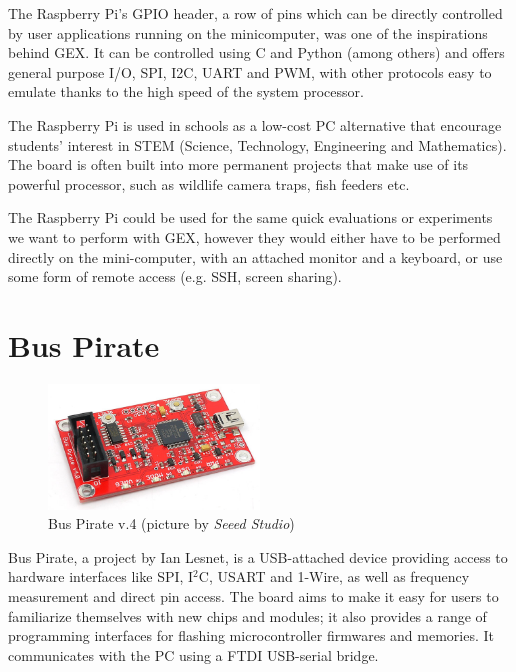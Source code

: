 The Raspberry Pi's GPIO header, a row of pins which can be directly controlled by user applications running on the minicomputer, was one of the inspirations behind GEX. It can be controlled using C and Python (among others) and offers general purpose I/O, SPI, I2C, UART and PWM, with other protocols easy to emulate thanks to the high speed of the system processor.

The Raspberry Pi is used in schools as a low-cost PC alternative that encourage students' interest in STEM (Science, Technology, Engineering and Mathematics). The board is often built into more permanent projects that make use of its powerful processor, such as wildlife camera traps, fish feeders etc.

The Raspberry Pi could be used for the same quick evaluations or experiments we want to perform with GEX, however they would either have to be performed directly on the mini-computer, with an attached monitor and a keyboard, or use some form of remote access (e.g. SSH, screen sharing).

\section{Bus Pirate}

\begin{figure}[H]
	\centering
	\includegraphics[width=0.5\textwidth] {img/buspirate.jpg}
	\caption{\label{fig:buspirate}Bus Pirate v.4 (picture by \textit{Seeed Studio})}
\end{figure}


Bus Pirate, a project by Ian Lesnet, is a USB-attached device providing access to hardware interfaces like SPI, I$^2$C, USART and 1-Wire, as well as frequency measurement and direct pin access. The board aims to make it easy for users to familiarize themselves with new chips and modules; it also provides a range of programming interfaces for flashing microcontroller firmwares and memories. It communicates with the PC using a FTDI USB-serial bridge.

